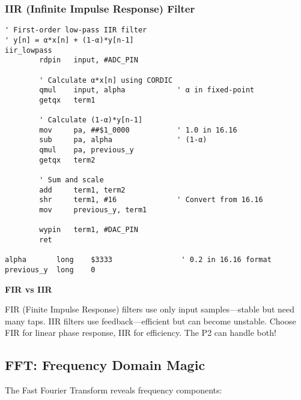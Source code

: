 \documentclass[11pt]{book}
\begin{document}
\hypertarget{iir-infinite-impulse-response-filter}{%
\subsubsection{IIR (Infinite Impulse Response)
Filter}\label{iir-infinite-impulse-response-filter}}

\begin{lstlisting}
' First-order low-pass IIR filter
' y[n] = α*x[n] + (1-α)*y[n-1]
iir_lowpass
        rdpin   input, #ADC_PIN
        
        ' Calculate α*x[n] using CORDIC
        qmul    input, alpha            ' α in fixed-point
        getqx   term1
        
        ' Calculate (1-α)*y[n-1]
        mov     pa, ##$1_0000           ' 1.0 in 16.16
        sub     pa, alpha               ' (1-α)
        qmul    pa, previous_y
        getqx   term2
        
        ' Sum and scale
        add     term1, term2
        shr     term1, #16              ' Convert from 16.16
        mov     previous_y, term1
        
        wypin   term1, #DAC_PIN
        ret
        
alpha       long    $3333                ' 0.2 in 16.16 format
previous_y  long    0
\end{lstlisting}

\begin{sidetrack}
\textbf{FIR vs IIR}

FIR (Finite Impulse Response) filters use only input samples—stable but need many taps. IIR filters use feedback—efficient but can become unstable. Choose FIR for linear phase response, IIR for efficiency. The P2 can handle both!
\end{sidetrack}

\hypertarget{fft-frequency-domain-magic}{%
\subsection{FFT: Frequency Domain
Magic}\label{fft-frequency-domain-magic}}

The Fast Fourier Transform reveals frequency components:
\end{document}
